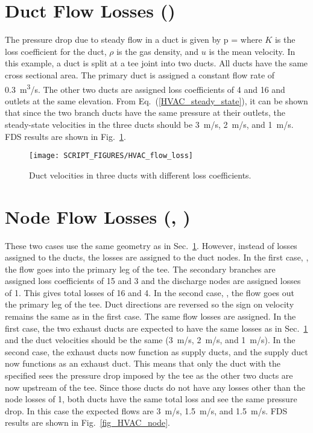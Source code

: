 \documentclass[11pt]{book}
\begin{document}
\section{Duct Flow Losses (\texorpdfstring{}{HVAC\_flow\_loss})}
\label{HVAC_flow_loss}

The pressure drop due to steady flow in a duct is given by
\be
\Delta p =   \label {HVAC_steady_state}
\ee
where $K$ is the loss coefficient for the duct, $\rho$ is the gas density, and $u$ is the mean velocity. In this example, a duct is split at a tee joint into two ducts. All ducts have the same cross sectional area.  The primary duct is assigned a constant flow rate of 0.3~\si{m^3/s}.  The other two ducts are assigned loss coefficients of 4 and 16 and outlets at the same elevation.  From Eq.~(\ref{HVAC_steady_state}), it can be shown that since the two branch ducts have the same pressure at their outlets, the steady-state velocities in the three ducts should be 3~m/s, 2~m/s, and 1~m/s.  FDS results are shown in Fig.~\ref{fig_HVAC_loss}.

\begin{figure}[ht]
\centering
\texttt{[image: SCRIPT\_FIGURES/HVAC\_flow\_loss]}
\caption[The  test case]{Duct velocities in three ducts with different loss coefficients.}
\label{fig_HVAC_loss}
\end{figure}


\section{Node Flow Losses (\texorpdfstring{}{HVAC\_tee\_loss\_1}, \texorpdfstring{}{HVAC\_tee\_loss\_2})}
\label{HVAC_tee_loss_1}
\label{HVAC_tee_loss_2}

These two cases use the same geometry as in Sec.~\ref{HVAC_flow_loss}. However, instead of losses assigned to the ducts, the losses are assigned to the duct nodes.  In the first case, , the flow goes into the primary leg of the tee. The secondary branches are assigned loss coefficients of 15 and 3 and the discharge nodes are assigned losses of 1.  This gives total losses of 16 and 4. In the second case, , the flow goes out the primary leg of the tee. Duct directions are reversed so the sign on velocity remains the same as in the first case.  The same flow losses are assigned. In the first case, the two exhaust ducts are expected to have the same losses as in Sec.~\ref{HVAC_flow_loss} and the duct velocities should be the same (3~m/s, 2~m/s, and 1~m/s). In the second case, the exhaust ducts now function as supply ducts, and the supply duct now functions as an exhaust duct. This means that only the duct with the specified sees the pressure drop imposed by the tee as the other two ducts are now upstream of the tee. Since those ducts do not have any losses other than the node losses of 1, both ducts have the same total loss and see the same pressure drop. In this case the expected flows are 3~m/s, 1.5~m/s, and 1.5~m/s. FDS results are shown in Fig.~\ref{fig_HVAC_node}.
\end{document}
